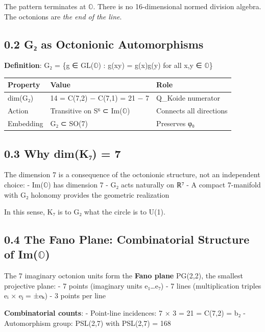 \documentclass[11pt,a4paper]{article}
\begin{document}
The pattern terminates at \ensuremath{\mathbb{O}}. There is no 16-dimensional normed division algebra. The octonions are \emph{the end of the line}.

\subsection{0.2 G₂ as Octonionic Automorphisms}\label{gux2082-as-octonionic-automorphisms}

\textbf{Definition}: G₂ = \{g ∈ GL(\ensuremath{\mathbb{O}}) : g(xy) = g(x)g(y) for all x,y ∈ \ensuremath{\mathbb{O}}\}

\begin{longtable}[]{@{}lll@{}}
\toprule\noalign{}
Property & Value & Role \\
\midrule\noalign{}
\endhead
\bottomrule\noalign{}
\endlastfoot
dim(G₂) & 14 = C(7,2) − C(7,1) = 21 − 7 & Q\_\allowbreak{}Koide numerator \\
Action & Transitive on S⁶ ⊂ Im(\ensuremath{\mathbb{O}}) & Connects all directions \\
Embedding & G₂ ⊂ SO(7) & Preserves φ₀ \\
\end{longtable}

\subsection{0.3 Why dim(K₇) = 7}\label{why-dimkux2087-7}

The dimension 7 is a consequence of the octonionic structure, not an independent choice: - Im(\ensuremath{\mathbb{O}}) has dimension 7 - G₂ acts naturally on ℝ⁷ - A compact 7-manifold with G₂ holonomy provides the geometric realization

In this sense, K₇ is to G₂ what the circle is to U(1).

\subsection{0.4 The Fano Plane: Combinatorial Structure of Im(\ensuremath{\mathbb{O}})}\label{the-fano-plane-combinatorial-structure-of-imux1d546}

The 7 imaginary octonion units form the \textbf{Fano plane} PG(2,2), the smallest projective plane: - 7 points (imaginary units e₁\ldots e₇) - 7 lines (multiplication triples eᵢ × eⱼ = ±eₖ) - 3 points per line

\textbf{Combinatorial counts}: - Point-line incidences: 7 × 3 = 21 = C(7,2) = b₂ - Automorphism group: PSL(2,7) with \textbar PSL(2,7)\textbar{} = 168
\end{document}
